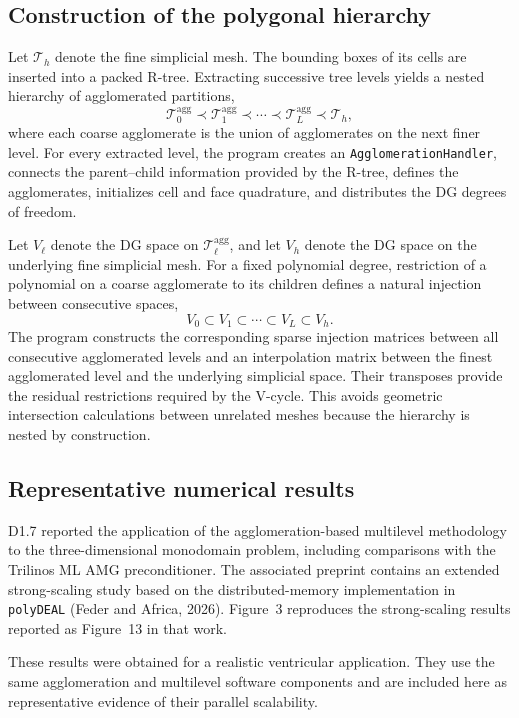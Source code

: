 \documentclass[a4paper,12pt]{article}
\begin{document}
\subsection{{Construction of the polygonal hierarchy}}
Let \(\mathcal T_h\) denote the fine simplicial mesh. The bounding boxes of
its cells are inserted into a packed R-tree. Extracting successive tree
levels yields a nested hierarchy of agglomerated partitions,
\[
    \mathcal T_0^{\mathrm{agg}}
    \prec
    \mathcal T_1^{\mathrm{agg}}
    \prec \cdots \prec
    \mathcal T_L^{\mathrm{agg}}
    \prec
    \mathcal T_h,
\]
where each coarse agglomerate is the union of agglomerates on the next finer
level. For every extracted level, the program creates an
\texttt{AgglomerationHandler}, connects the parent--child information provided
by the R-tree, defines the agglomerates, initializes cell and face quadrature,
and distributes the DG degrees of freedom.

Let \(V_\ell\) denote the DG space on
\(\mathcal{T}^{\mathrm{agg}}_\ell\), and let \(V_h\) denote the DG
space on the underlying fine simplicial mesh. For a fixed polynomial
degree, restriction of a polynomial on a coarse agglomerate to its
children defines a natural injection between consecutive spaces,
\[
    V_0 \subset V_1 \subset \cdots \subset V_L \subset V_h.
\]
The program constructs the corresponding sparse injection matrices between
all consecutive agglomerated levels and an interpolation matrix between the
finest agglomerated level and the underlying simplicial space. Their
transposes provide the residual restrictions required by the V-cycle. This
avoids geometric intersection calculations between unrelated meshes because
the hierarchy is nested by construction.


\subsection{Representative numerical results}
\label{subsec:representative_results}
D1.7 reported the application of the agglomeration-based multilevel
methodology to the three-dimensional monodomain problem, including
comparisons with the Trilinos ML AMG preconditioner. The associated
preprint contains an extended strong-scaling study based on the
distributed-memory implementation in \texttt{polyDEAL}
(Feder and Africa, 2026). Figure~3 reproduces the strong-scaling
results reported as Figure~13 in that work.

These results were obtained for a realistic ventricular application.
They use the same
agglomeration and multilevel software components and are included here
as representative evidence of their parallel scalability.
\end{document}
